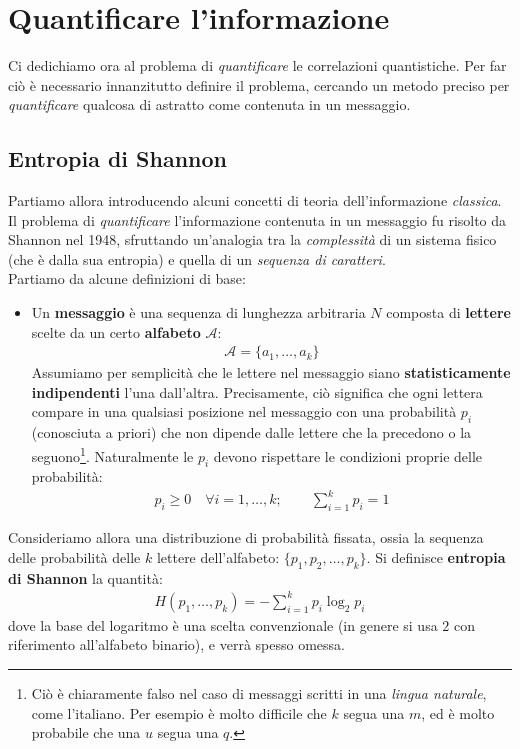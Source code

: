 \documentclass[../../InformazioneQuantistica.tex]{subfiles}
\begin{document}
\section{Quantificare l'informazione}

Ci dedichiamo ora al problema di \textit{quantificare} le correlazioni quantistiche. Per far ciò è necessario innanzitutto definire il problema, cercando un metodo preciso per \textit{quantificare} qualcosa di astratto come  contenuta in un messaggio. 

\subsection{Entropia di Shannon}
Partiamo allora introducendo alcuni concetti di teoria dell'informazione \textit{classica}. Il problema di \textit{quantificare} l'informazione contenuta in un messaggio fu risolto da Shannon nel 1948, sfruttando un'analogia  tra la \textit{complessità} di un sistema fisico (che è  dalla sua entropia) e quella di un \textit{sequenza di caratteri}.\\

Partiamo da alcune definizioni di base:
\begin{itemize}
\item Un \textbf{messaggio} è una sequenza di lunghezza arbitraria $N$ composta di \textbf{lettere} scelte da un certo \textbf{alfabeto} $\mathcal{A}$:
\begin{align*}
\mathcal{A} = \{ a_1, \dots, a_k\}
\end{align*}
Assumiamo per semplicità che le lettere nel messaggio siano \textbf{statisticamente indipendenti} l'una dall'altra. Precisamente, ciò significa che ogni lettera compare in una qualsiasi posizione nel messaggio con una probabilità $p_i$ (conosciuta a priori) che non dipende dalle lettere che la precedono o la seguono\footnote{Ciò è chiaramente falso nel caso di messaggi scritti in una \textit{lingua naturale}, come l'italiano. Per esempio è molto difficile che $k$ segua una $m$, ed è molto probabile che una $u$ segua una $q$.}. Naturalmente le $p_i$ devono rispettare le condizioni proprie delle probabilità:
\begin{align*}
p_i \geq 0 \quad \forall i=1,\dots, k; \qquad \sum_{i=1}^k p_i = 1
\end{align*}
\end{itemize}

Consideriamo allora una distribuzione di probabilità fissata, ossia la sequenza delle probabilità delle $k$ lettere dell'alfabeto: $\{p_1, p_2, \dots, p_k\}$. Si definisce \textbf{entropia di Shannon} la quantità:
\begin{align*}
H(p_1, \dots, p_k) = -\sum_{i=1}^k p_i \log_2 p_i
\end{align*}
dove la base del logaritmo è una scelta convenzionale (in genere si usa $2$ con riferimento all'alfabeto binario), e verrà spesso omessa.\\
\end{document}

